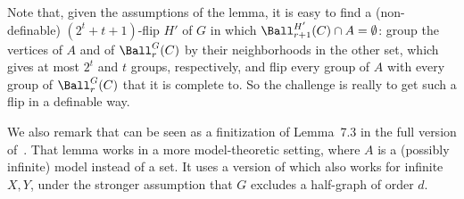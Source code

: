 \lemBallFlip*

Note that, given the assumptions of the lemma, it is easy to find a (non-definable) $(2^t+t+1)$-flip $H'$ of $G$ in which $\Ball_{r+1}^{H'}(C) \cap A = \emptyset$: group the vertices of $A$ and of $\Ball_r^G(C)$ by their neighborhoods in the other set, which gives at most $2^t$ and $t$ groups, respectively, and flip every group of $A$ with every group of $\Ball_r^G(C)$ that it is complete to.
So the challenge is really to get such a flip in a definable way.

We also remark that  can be seen as a finitization of Lemma~7.3 in the full version of~\cite{flippers}.
That lemma works in a more model-theoretic setting, where $A$ is a (possibly infinite) model instead of a set.
It uses a version of  which also works for infinite $X,Y$, under the stronger
assumption that $G$ excludes a half-graph of order $d$.

